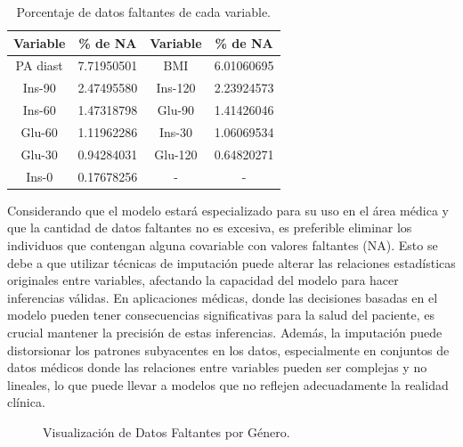 \begin{table}[H]
\centering
\begin{tabular}{||c|c||c|c||}
\hline\hline
\textbf{Variable} & \textbf{\% de NA} & \textbf{Variable} & \textbf{\% de NA} \\ \hline\hline
PA diast          & 7.71950501        & BMI               & 6.01060695        \\ \hline
Ins-90            & 2.47495580        & Ins-120           & 2.23924573        \\ \hline
Ins-60            & 1.47318798        & Glu-90            & 1.41426046        \\ \hline
Glu-60            & 1.11962286        & Ins-30            & 1.06069534        \\ \hline
Glu-30            & 0.94284031        & Glu-120           & 0.64820271        \\ \hline
Ins-0             & 0.17678256        & -                 & -       \\ \hline\hline
\end{tabular}
\caption{Porcentaje de datos faltantes de cada variable.}
\label{tab:PorcentajeNA}
\end{table}

Considerando que el modelo estará especializado para su uso en el área médica y que la cantidad de datos faltantes no es excesiva, es preferible eliminar los individuos que contengan alguna covariable con valores faltantes (NA). Esto se debe a que utilizar técnicas de imputación puede alterar las relaciones estadísticas originales entre variables, afectando la capacidad del modelo para hacer inferencias válidas. En aplicaciones médicas, donde las decisiones basadas en el modelo pueden tener consecuencias significativas para la salud del paciente, es crucial mantener la precisión de estas inferencias. Además, la imputación puede distorsionar los patrones subyacentes en los datos, especialmente en conjuntos de datos médicos donde las relaciones entre variables pueden ser complejas y no lineales, lo que puede llevar a modelos que no reflejen adecuadamente la realidad clínica.

\begin{figure}[H]
 \centering
    \caption{Visualización de Datos Faltantes por Género.}
    \label{fig:FaltantesGen}
\end{figure}

